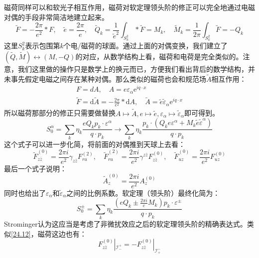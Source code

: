 磁荷同样可以和软光子相互作用，磁荷对软定理领头阶的修正可以完全地通过电磁对偶的手段非常简洁地建立起来。
\begin{equation}
	\tilde{F}=-\frac{2\pi}{e^{2}}*F,\quad\tilde{e}=\frac{2\pi}{e},\quad\tilde{Q}_{k}=\frac{1}{\tilde{e}^{2}}\int_{S_{k}^{2}}*\tilde{F}=M_{k},\quad\tilde{M}_{k}=\frac{1}{2\pi}\int_{S_{k}^{2}}\tilde{F}=-Q_{k}
\end{equation}
这里$S_k^2$表示包围第$k$个电/磁荷的球面。通过上面的对偶变换，我们建立了$\left(\tilde{Q},\tilde{M}\right)\leftrightarrow\left(M,-Q\right)$的对应，从数学结构上看，磁荷和电荷是完全类似的。注意，我们这里做的操作只是数学上的换元而已，方便我们看出背后的数学结构，并未事先假定电磁之间存在某种对偶。那么类似的磁荷也会和规范场$\tilde{A}$相互作用：
\begin{align}
	F=dA,\quad A=e\varepsilon_\alpha \mathrm{e}^{iq\cdot x}\\
	\tilde{F}=\mathrm{d}\tilde{A}=-\frac{2\pi}{e^2}*\mathrm{d}A,\quad \tilde{A}=\tilde{e}\tilde{\varepsilon}_\alpha \mathrm{e}^{iq\cdot x}
\end{align}
所以磁荷那部分的修正只需要做替换$A\mapsto \tilde A,e\mapsto \tilde e,\varepsilon_\alpha\mapsto \tilde{\varepsilon}_\alpha$即可得到。
\begin{equation}
	S_0^\alpha=\sum_k\eta_k\frac{eQ_kp_k\cdot\varepsilon^\alpha}{q\cdot p_k}\to \sum_k\eta_k\frac{p_k\cdot(Q_ke\varepsilon^\alpha+M_k\tilde{e}\tilde{\varepsilon}^\alpha)}{q\cdot p_k}
\end{equation}
这个式子可以进一步化简，将前面的对偶推到天球上去看：
\begin{equation}
	\tilde{F}_{z\bar{z}}^{(0)}=\frac{2\pi i}{e^2}\gamma_{z\bar{z}}F_{ru}^{(2)},\quad\tilde{F}_{ru}^{(2)}=\frac{2\pi i}{e^2}\gamma^{z\bar{z}}F_{z\bar{z}}^{(0)},\quad\tilde{F}_{uz}^{(0)}=\frac{2\pi i}{e^2}F_{uz}^{(0)}
\end{equation}
最后一个式子说明：
\begin{equation}
	\tilde{A}_z^{(0)}=\frac{2\pi i}{e^2}A_z^{(0)}
\end{equation}
同时也给出了$\varepsilon_\alpha$和$\tilde{\varepsilon}_\alpha$之间的比例系数。软定理（领头阶）最终化简为：
\begin{equation}\label{28.7}
	\boxed{S_0^\pm=\sum_k\eta_k\frac{(eQ_k\pm\frac{2\pi i}{e}M_k)p_k\cdot\varepsilon^\pm}{q\cdot p_k}}
\end{equation}
Strominger认为这应当是考虑了非微扰效应之后的软定理领头阶的精确表达式。类似\ref{24.12}，磁荷这边也有：
\begin{equation}
	F_{z\bar{z}}^{(0)}|_{\mathcal I_{-}^{+}}=-F_{z\bar{z}}^{(0)}|_{\mathcal I_{+}^{-}}
\end{equation}
